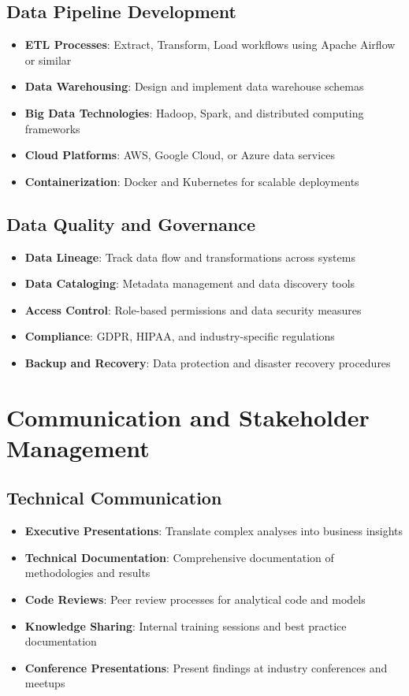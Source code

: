 \documentclass[11pt,a4paper]{article}
\begin{document}
\subsection{Data Pipeline Development}
\begin{itemize}[leftmargin=*]
    \item \textbf{ETL Processes}: Extract, Transform, Load workflows using Apache Airflow or similar
    \item \textbf{Data Warehousing}: Design and implement data warehouse schemas
    \item \textbf{Big Data Technologies}: Hadoop, Spark, and distributed computing frameworks
    \item \textbf{Cloud Platforms}: AWS, Google Cloud, or Azure data services
    \item \textbf{Containerization}: Docker and Kubernetes for scalable deployments
\end{itemize}

\subsection{Data Quality and Governance}
\begin{itemize}[leftmargin=*]
    \item \textbf{Data Lineage}: Track data flow and transformations across systems
    \item \textbf{Data Cataloging}: Metadata management and data discovery tools
    \item \textbf{Access Control}: Role-based permissions and data security measures
    \item \textbf{Compliance}: GDPR, HIPAA, and industry-specific regulations
    \item \textbf{Backup and Recovery}: Data protection and disaster recovery procedures
\end{itemize}

\section{Communication and Stakeholder Management}

\subsection{Technical Communication}
\begin{itemize}[leftmargin=*]
    \item \textbf{Executive Presentations}: Translate complex analyses into business insights
    \item \textbf{Technical Documentation}: Comprehensive documentation of methodologies and results
    \item \textbf{Code Reviews}: Peer review processes for analytical code and models
    \item \textbf{Knowledge Sharing}: Internal training sessions and best practice documentation
    \item \textbf{Conference Presentations}: Present findings at industry conferences and meetups
\end{itemize}
\end{document}

